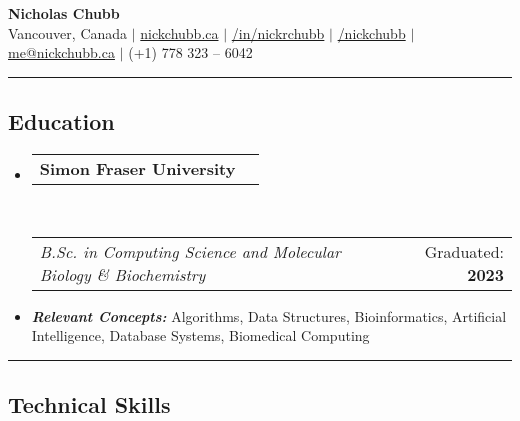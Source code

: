 \documentclass[10pt,a4paper]{article}
\makeatletter
\newcommand{\headerrow}[2]
{\begin{tabular*}{\linewidth}{l@{\extracolsep{\fill}}r}
	#1 &
	#2 \\
\end{tabular*}}
\makeatother
\begin{document}
 

\begin{center}

{\Huge \textbf{Nicholas Chubb}} \\
\vspace{1em}
{\small
{{ }\faHome { }Vancouver, Canada} $|$ 
{{ }\faGlobe { } \href{https://nickchubb.ca/}{nickchubb.ca}} $|$ 
{{ }\faLinkedinSquare { } \href{https://linkedin.com/in/nickrchubb}{/in/nickrchubb}} $|$ 
{{ }\faGithub { } \href{https://github.com/NickChubb}{/nickchubb}} $|$ 
{{ }\faEnvelope { } \href{mailto:nick@nickchubb.ca}{me@nickchubb.ca}} $|$  
{{ }\faPhoneSquare { } (+1) 778 323 -- 6042}\\ 
}
\end{center}

\hrule %
\vspace{-0.4em}

\subsection*{Education}

\vspace{-0.2em}

\begin{itemize}[leftmargin=0em]

	\parskip=0.1em

	\item[] 
	\headerrow
		{\textbf{Simon Fraser University}}
        {}
	\\
	\headerrow
		{\textit{B.Sc. in Computing Science and Molecular Biology \& Biochemistry}}
		{\small{{Graduated:} \textbf{2023}}}
		
	\item[]
	\hspace{10px} {\small\textbf{\textit{Relevant Concepts:}} Algorithms, Data Structures, Bioinformatics, Artificial Intelligence, Database Systems, Biomedical Computing}
	

\end{itemize}

\vspace{0.2em}
\hrule %
\vspace{-0.4em}

\subsection*{Technical Skills}
\end{document}
